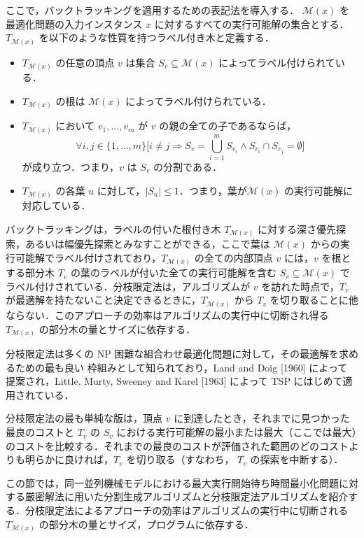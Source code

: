 \documentclass[12pt]{optlab-bachelor}
\begin{document}
ここで，バックトラッキングを適用するための表記法を導入する．
$\mathcal{M}(x)$ を最適化問題の入力インスタンス $x$ に対するすべての実行可能解の集合とする．$T_{\mathcal{M}(x)}$ を以下のような性質を持つラベル付き木と定義する．
\begin{itemize}
  \item $T_{\mathcal{M}(x)}$ の任意の頂点 $v$ は集合 $S_v \subseteq \mathcal{M}(x)$ によってラベル付けられている．
  \item $T_{\mathcal{M}(x)}$ の根は $\mathcal{M}(x)$ によってラベル付けられている．
  \item $T_{\mathcal{M}(x)}$ において $v_1,\ldots,v_m$ が $v$ の親の全ての子であるならば，$$\forall i,j \in \{1,\ldots,m\}\bigg[i \neq j \Rightarrow S_v = \bigcup_{i = 1}^{m}S_{v_i} \land S_{v_i} \cap S_{v_j} = \emptyset \bigg]$$ が成り立つ．つまり，$v$ は $S_v$ の分割である．
  \item $T_{\mathcal{M}(x)}$ の各葉 $u$ に対して，$|S_u| \le 1$．つまり，葉が$\mathcal{M}(x)$ の実行可能解に対応している．
\end{itemize}

バックトラッキングは，ラベルの付いた根付き木 $T_{\mathcal{M}(x)}$ に対する深さ優先探索，あるいは幅優先探索とみなすことができる，ここで葉は $\mathcal{M}(x)$ からの実行可能解でラベル付けされており，$T_{\mathcal{M}(x)}$ の全ての内部頂点 $v$ には，$v$ を根とする部分木 $T_v$ の葉のラベルが付いた全ての実行可能解を含む $S_v \subseteq \mathcal{M}(x)$ でラベル付けされている．分枝限定法は，アルゴリズムが $v$ を訪れた時点で，$T_v$ が最適解を持たないこと決定できるときに，$T_{\mathcal{M}(x)}$ から $T_v$ を切り取ることに他ならない．このアプローチの効率はアルゴリズムの実行中に切断され得る $T_{\mathcal{M}(x)}$ の部分木の量とサイズに依存する．

分枝限定法は多くの NP 困難な組合わせ最適化問題に対して，その最適解を求めるための最も良い
枠組みとして知られており，Land and Doig [1960] \cite{BandB} によって
提案され，Little, Murty, Sweeney and Karel [1963] \cite{BandB2}
によって TSP にはじめて適用されている．

分枝限定法の最も単純な版は，頂点 $v$ に到達したとき，それまでに見つかった最良のコストと $T_v$
の $S_v$ における実行可能解の最小または最大（ここでは最大）のコストを比較する．それまでの最良のコストが評価された範囲のどのコストよりも明らかに良ければ，$T_v$ を切り取る（すなわち， $T_v$ の探索を中断する）．


この節では，同一並列機械モデルにおける最大実行開始待ち時間最小化問題に対する厳密解法に用いた分割生成アルゴリズムと分枝限定法アルゴリズムを紹介する．分枝限定法によるアプローチの効率はアルゴリズムの実行中に切断される $T_{\mathcal{M}(x)}$ の部分木の量とサイズ，プログラムに依存する．%
\end{document}

